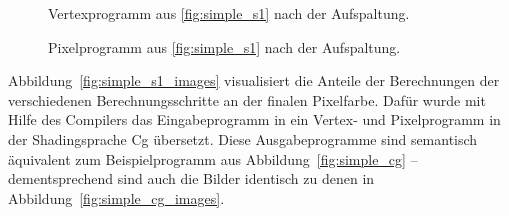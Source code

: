 \documentclass[twoside,a4paper,fleqn,12pt]{book}
\begin{document}
\begin{figure}[h!t]
  \centering
  
  \caption{Vertexprogramm aus \ref{fig:simple_s1} nach der Aufspaltung.}
  \label{fig:simple_s1_split_vp}
\end{figure}

\begin{figure}[h!t]
  \centering
  
  \caption{Pixelprogramm aus \ref{fig:simple_s1} nach der Aufspaltung.}
  \label{fig:simple_s1_split_fp}
\end{figure}





Abbildung~\ref{fig:simple_s1_images} visualisiert die Anteile der Berechnungen der verschiedenen Berechnungsschritte
an der finalen Pixelfarbe. Dafür wurde mit Hilfe des Compilers das Eingabeprogramm in ein Vertex- und Pixelprogramm
in der Shadingsprache Cg übersetzt. Diese Ausgabeprogramme sind semantisch äquivalent zum Beispielprogramm aus
Abbildung~\ref{fig:simple_cg} -- dementsprechend sind auch die Bilder identisch zu denen in Abbildung~\ref{fig:simple_cg_images}.
\end{document}
